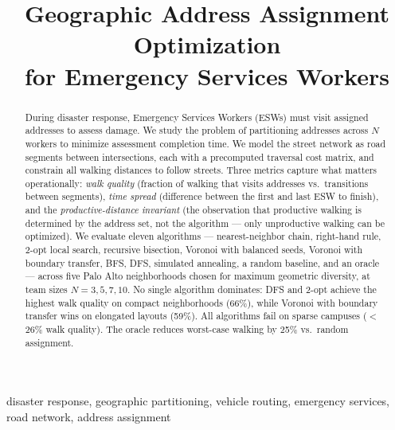 \documentclass[conference]{IEEEtran}
\begin{document}
\title{Geographic Address Assignment Optimization\\for Emergency Services Workers}

\author{
}

\maketitle
\thispagestyle{plain}
\renewcommand{\thefootnote}{}
\renewcommand{\thefootnote}{\arabic{footnote}}

\begin{abstract}
During disaster response, Emergency Services Workers (ESWs) must visit assigned addresses to assess damage. We study the problem of partitioning addresses across $N$ workers to minimize assessment completion time. We model the street network as road segments between intersections, each with a precomputed traversal cost matrix, and constrain all walking distances to follow streets. Three metrics capture what matters operationally: \emph{walk quality} (fraction of walking that visits addresses vs.\ transitions between segments), \emph{time spread} (difference between the first and last ESW to finish), and the \emph{productive-distance invariant} (the observation that productive walking is determined by the address set, not the algorithm --- only unproductive walking can be optimized). We evaluate eleven algorithms --- nearest-neighbor chain, right-hand rule, 2-opt local search, recursive bisection, Voronoi with balanced seeds, Voronoi with boundary transfer, BFS, DFS, simulated annealing, a random baseline, and an oracle --- across five Palo Alto neighborhoods chosen for maximum geometric diversity, at team sizes $N = 3, 5, 7, 10$. No single algorithm dominates: DFS and 2-opt achieve the highest walk quality on compact neighborhoods (66\%), while Voronoi with boundary transfer wins on elongated layouts (59\%). All algorithms fail on sparse campuses ($<$26\% walk quality). The oracle reduces worst-case walking by 25\% vs.\ random assignment.
\end{abstract}

\begin{IEEEkeywords}
disaster response, geographic partitioning, vehicle routing, emergency services, road network, address assignment
\end{IEEEkeywords}
\end{document}

